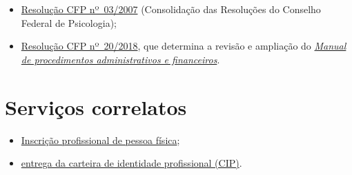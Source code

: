 \begin{itemize}
	\item
	\href{https://atosoficiais.com.br/cfp/resolucao-administrativa-financeira-n-3-2007-institui-a-consolidacao-das-resolucoes-do-conselho-federal-de-psicologia?origin=instituicao&q=resolu\%C3\%A7\%C3\%A3o\%203/2007}{Resolução CFP nº~03/2007} (Consolidação das Resoluções do Conselho Federal de Psicologia);
	\item
	\href{https://transparencia.cfp.org.br/wp-content/uploads/sites/7/2020/05/Manual-de-Procedimentos-Administrativos-e-Financeiro-CFP-RES-20.2018.pdf}{\href{https://atosoficiais.com.br/cfp/resolucao-administrativa-financeira-n-20-2018-altera-o-manual-de-procedimentos-administrativo-e-financeiro-do-sistema-conselhos-de-psicologia-anexo-da-resolucao-cfp-n-202018-a-resolucao-cfp-n-03-2007-a-resolucao-cfp-n-16-2019-e-da-outras-providencias}{Resolução CFP nº~20/2018}}, que determina a revisão e ampliação do
	\href{https://transparencia.cfp.org.br/wp-content/uploads/sites/7/2020/05/Manual-de-Procedimentos-Administrativos-e-Financeiro-CFP-RES-20.2018.pdf}{\emph{Manual de procedimentos administrativos e financeiros}}.
\end{itemize}

\section{Serviços correlatos}

\begin{itemize}
	\item
	\hyperref[chap:pf-inscricao]{Inscrição profissional de pessoa física};
	\item
	\hyperref[chap:pf-cip]{entrega da carteira de identidade profissional (CIP)}.
\end{itemize}

\sumario